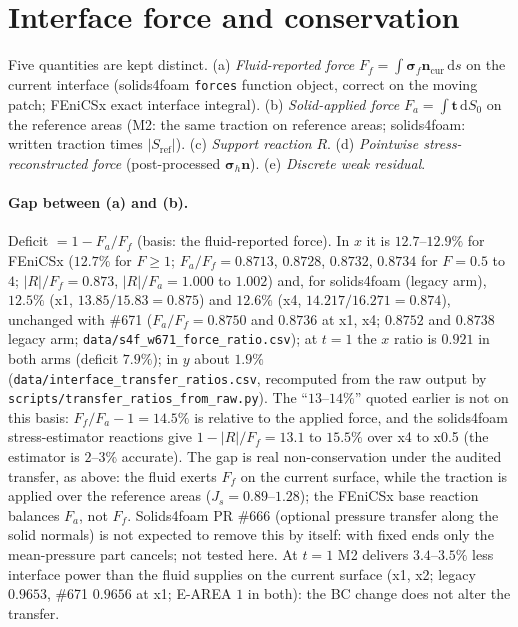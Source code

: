 \documentclass[sn-mathphys,Numbered]{sn-jnl}
\begin{document}
\section{Interface force and conservation}\label{sec:fx_force}
Five quantities are kept distinct. (a) \emph{Fluid-reported force} $F_f=\int\bm\sigma_f\bm n_\mathrm{cur}\,\mathrm{d}s$ on the current interface (solids4foam \texttt{forces} function object, correct on the moving patch; FEniCSx exact interface integral). (b) \emph{Solid-applied force} $F_a=\int\bm t\,\mathrm{d}S_0$ on the reference areas (M2: the same traction on reference areas; solids4foam: written traction times $|S_\mathrm{ref}|$). (c) \emph{Support reaction} $R$. (d) \emph{Pointwise stress-reconstructed force} (post-processed $\bm\sigma_h\bm n$). (e) \emph{Discrete weak residual}.

\paragraph{Gap between (a) and (b).}
Deficit $=1-F_a/F_f$ (basis: the fluid-reported force). In $x$ it is $12.7$--$12.9\%$ for FEniCSx ($12.7\%$ for $F\ge1$; $F_a/F_f=0.8713$, $0.8728$, $0.8732$, $0.8734$ for $F=0.5$ to $4$; $|R|/F_f=0.873$, $|R|/F_a=1.000$ to $1.002$) and, for solids4foam (legacy arm), $12.5\%$ (x1, $13.85/15.83=0.875$) and $12.6\%$ (x4, $14.217/16.271=0.874$), unchanged with \#671 ($F_a/F_f=0.8750$ and $0.8736$ at x1, x4; $0.8752$ and $0.8738$ legacy arm; \texttt{data/s4f\_w671\_force\_ratio.csv}); at $t=1$ the $x$ ratio is $0.921$ in both arms (deficit $7.9\%$); in $y$ about $1.9\%$ (\texttt{data/interface\_transfer\_ratios.csv}, recomputed from the raw output by \texttt{scripts/transfer\_ratios\_from\_raw.py}).
The ``$13$--$14\%$'' quoted earlier is not on this basis: $F_f/F_a-1=14.5\%$ is relative to the applied force, and the solids4foam stress-estimator reactions give $1-|R|/F_f=13.1$ to $15.5\%$ over x4 to x0.5 (the estimator is $2$--$3\%$ accurate).
The gap is real non-conservation under the audited transfer, as above: the fluid exerts $F_f$ on the current surface, while the traction is applied over the reference areas ($J_s=0.89$--$1.28$); the FEniCSx base reaction balances $F_a$, not $F_f$.
Solids4foam PR \#666 (optional pressure transfer along the solid normals) is not expected to remove this by itself: with fixed ends only the mean-pressure part cancels; not tested here.
At $t=1$ M2 delivers $3.4$--$3.5\%$ less interface power than the fluid supplies on the current surface (x1, x2; legacy $0.9653$, \#671 $0.9656$ at x1; E-AREA $1$ in both): the BC change does not alter the transfer.
\end{document}
